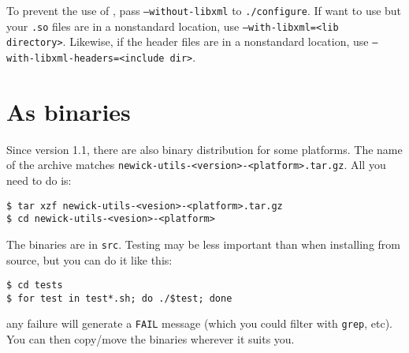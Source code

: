 To prevent the use of \libxml, pass \texttt{--without-libxml} to
\texttt{./configure}. If want to use \libxml{} but your \texttt{.so} files are
in a nonstandard location, use \texttt{--with-libxml=<lib directory>}. Likewise,
if the \libxml{} header files are in a nonstandard location, use
\texttt{--with-libxml-headers=<include dir>}.

\section{As binaries}

Since version 1.1, there are also binary distribution for some platforms. The
name of the archive matches \texttt{newick-utils-<version>-<platform>.tar.gz}.
All you need to do is:

\begin{verbatim}
$ tar xzf newick-utils-<vesion>-<platform>.tar.gz
$ cd newick-utils-<vesion>-<platform>
\end{verbatim}

\noindent{}The binaries are in \texttt{src}. Testing may be less important than
when installing from source, but you can do it like this:

\begin{verbatim}
$ cd tests
$ for test in test*.sh; do ./$test; done 
\end{verbatim}

\noindent{}any failure will generate a \texttt{FAIL} message (which you could filter with \texttt{grep}, etc).  You can then copy/move the binaries wherever it suits you.

